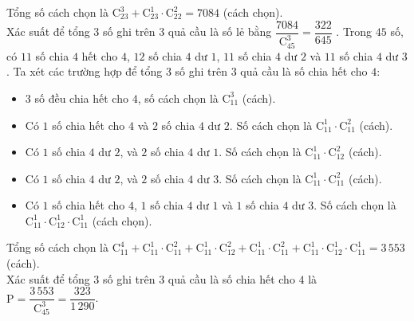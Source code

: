 \begin{ex}
{\begin{itemchoice}
\begin{itemize}
			\end{itemize}
			Tổng số cách chọn là $\mathrm{C}_{23}^3+\mathrm{C}_{23}^1 \cdot \mathrm{C}_{22}^2=7084$ (cách chọn). \\
			Xác suất để tổng $3$ số ghi trên $3$ quả cầu là số lẻ bằng $\dfrac{7084}{\mathrm{C}_{45}^3}=\dfrac{322}{645}$ .
			\itemch Trong $45$ số, có $11$ số chia $4$ hết cho $4$, $12$ số chia $4$ dư $1$, $11$ số chia $4$ dư $2$ và $11$ số chia $4$ dư $3$. Ta xét các trường hợp để tổng $3$ số ghi trên $3$ quả cầu là số chia hết cho $4$:
			\begin{itemize}
				\item $3$ số đều chia hết cho $4$, số cách chọn là $\mathrm{C}_{11}^3$ (cách).
				\item Có $1$ số chia hết cho $4$ và $2$ số chia $4$ dư $2$. Số cách chọn là $\mathrm{C}_{11}^1 \cdot \mathrm{C}_{11}^2$ (cách).
				\item Có $1$ số chia $4$ dư $2$, và $2$ số chia $4$ dư $1$. Số cách chọn là $\mathrm{C}_{11}^1 \cdot \mathrm{C}_{12}^2$ (cách).
				\item Có $1$ số chia $4$ dư $2$, và $2$ số chia $4$ dư $3$. Số cách chọn là $\mathrm{C}_{11}^1 \cdot \mathrm{C}_{11}^2$ (cách).
				\item Có $1$ số chia hết cho $4$, $1$ số chia $4$ dư $1$ và $1$ số chia $4$ dư $3$. Số cách chọn là $\mathrm{C}_{11}^1 \cdot \mathrm{C}_{12}^1 \cdot \mathrm{C}_{11}^1$ (cách chọn).
			\end{itemize}
			Tổng số cách chọn là $\mathrm{C}_{11}^4+\mathrm{C}_{11}^1 \cdot \mathrm{C}_{11}^2+\mathrm{C}_{11}^1 \cdot \mathrm{C}_{12}^2+\mathrm{C}_{11}^1 \cdot \mathrm{C}_{11}^2+\mathrm{C}_{11}^1 \cdot \mathrm{C}_{12}^1 \cdot \mathrm{C}_{11}^1=3\,553$ (cách). \\
			Xác suất để tổng $3$ số ghi trên $3$ quả cầu là số chia hết cho $4$ là $\mathrm{P}=\dfrac{3\,553}{\mathrm{C}_{45}^3}=\dfrac{323}{1\,290}$.
		\end{itemchoice}
	}
\end{ex}

